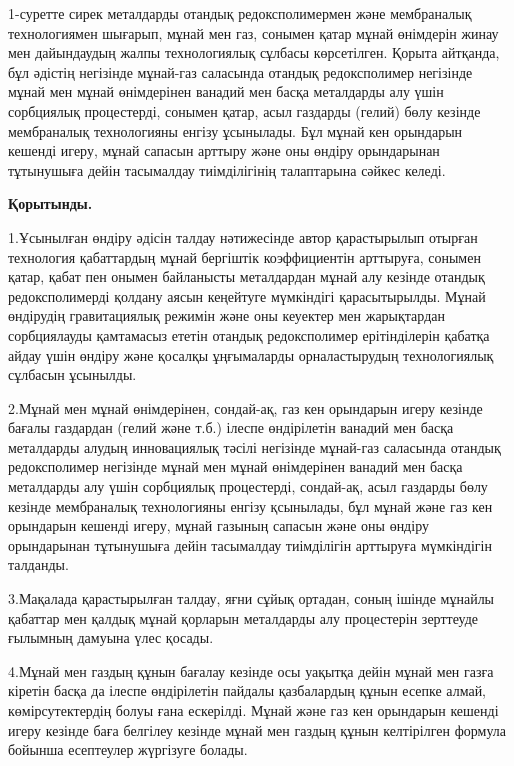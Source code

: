 \begin{multicols}{2}

1-суретте сирек металдарды отандық редоксполимермен және мембраналық
технологиямен шығарып, мұнай мен газ, сонымен қатар мұнай өнімдерін
жинау мен дайындаудың жалпы технологиялық сұлбасы көрсетілген. Қорыта
айтқанда, бұл әдістің негізінде мұнай-газ саласында отандық
редоксполимер негізінде мұнай мен мұнай өнімдерінен ванадий мен басқа
металдарды алу үшін сорбциялық процестерді, сонымен қатар, асыл газдарды
(гелий) бөлу кезінде мембраналық технологияны енгізу ұсынылады. Бұл
мұнай кен орындарын кешенді игеру, мұнай сапасын арттыру және оны өндіру
орындарынан тұтынушыға дейін тасымалдау тиімділігінің талаптарына сәйкес
келеді.

{\bfseries Қорытынды.}

1.Ұсынылған өндіру әдісін талдау нәтижесінде автор қарастырылып отырған
технология қабаттардың мұнай бергіштік коэффициентін арттыруға, сонымен
қатар, қабат пен онымен байланысты металдардан мұнай алу кезінде отандық
редоксполимерді қолдану аясын кеңейтуге мүмкіндігі қарасытырылды. Мұнай
өндірудің гравитациялық режимін және оны кеуектер мен жарықтардан
сорбциялауды қамтамасыз ететін отандық редоксполимер ерітінділерін
қабатқа айдау үшін өндіру және қосалқы ұңғымаларды орналастырудың
технологиялық сұлбасын ұсынылды.

2.Мұнай мен мұнай өнімдерінен, сондай-ақ, газ кен орындарын игеру
кезінде бағалы газдардан (гелий және т.б.) ілеспе өндірілетін ванадий
мен басқа металдарды алудың инновациялық тәсілі негізінде мұнай-газ
саласында отандық редоксполимер негізінде мұнай мен мұнай өнімдерінен
ванадий мен басқа металдарды алу үшін сорбциялық процестерді, сондай-ақ,
асыл газдарды бөлу кезінде мембраналық технологияны енгізу қсынылады,
бұл мұнай және газ кен орындарын кешенді игеру, мұнай газының сапасын
және оны өндіру орындарынан тұтынушыға дейін тасымалдау тиімділігін
арттыруға мүмкіндігін талданды.

3.Мақалада қарастырылған талдау, яғни сұйық ортадан, соның ішінде
мұнайлы қабаттар мен қалдық мұнай қорларын металдарды алу процестерін
зерттеуде ғылымның дамуына үлес қосады.

4.Мұнай мен газдың құнын бағалау кезінде осы уақытқа дейін мұнай мен
газға кіретін басқа да ілеспе өндірілетін пайдалы қазбалардың құнын
есепке алмай, көмірсутектердің болуы ғана ескерілді. Мұнай және газ кен
орындарын кешенді игеру кезінде баға белгілеу кезінде мұнай мен газдың
құнын келтірілген формула бойынша есептеулер жүргізуге болады.
\end{multicols}
